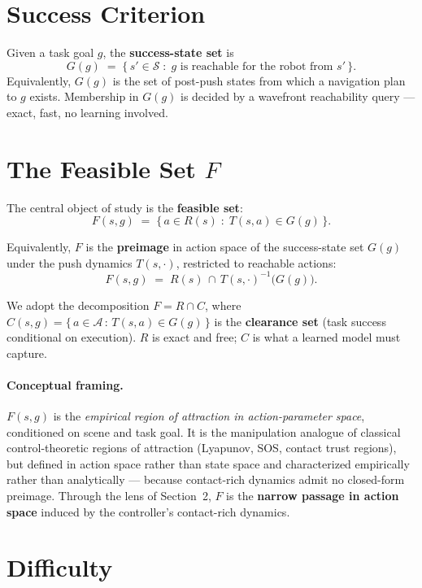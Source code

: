 \documentclass[11pt]{article}
\begin{document}
\section{Success Criterion}

Given a task goal $g$, the \textbf{success-state set} is
\[
  G(g) \;=\; \{\,s' \in \mathcal{S} \;:\; g \text{ is reachable for the robot from } s'\,\}.
\]
Equivalently, $G(g)$ is the set of post-push states from which a navigation
plan to $g$ exists. Membership in $G(g)$ is decided by a wavefront
reachability query --- exact, fast, no learning involved.

\section{The Feasible Set $F$}

The central object of study is the \textbf{feasible set}:
\[
  F(s, g) \;=\; \{\,a \in R(s) \;:\; T(s, a) \in G(g)\,\}.
\]

Equivalently, $F$ is the \textbf{preimage} in action space of the
success-state set $G(g)$ under the push dynamics $T(s, \cdot)$, restricted to
reachable actions:
\[
  F(s, g) \;=\; R(s) \,\cap\, T(s, \cdot)^{-1}\!\big(G(g)\big).
\]

We adopt the decomposition $F = R \cap C$, where
$C(s, g) = \{\,a \in \mathcal{A} \,:\, T(s, a) \in G(g)\,\}$ is the
\textbf{clearance set} (task success conditional on execution). $R$ is exact
and free; $C$ is what a learned model must capture.

\paragraph{Conceptual framing.}
$F(s, g)$ is the \emph{empirical region of attraction in action-parameter
space}, conditioned on scene and task goal. It is the manipulation analogue
of classical control-theoretic regions of attraction (Lyapunov, SOS, contact
trust regions), but defined in action space rather than state space and
characterized empirically rather than analytically --- because contact-rich
dynamics admit no closed-form preimage. Through the lens of Section~2, $F$
is the \textbf{narrow passage in action space} induced by the controller's
contact-rich dynamics.

\section{Difficulty}\label{sec:difficulty}
\end{document}
